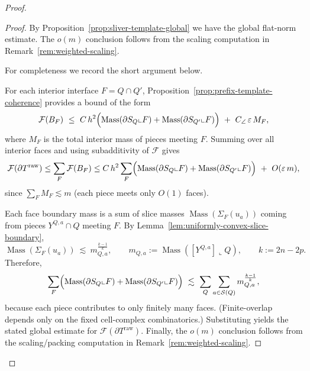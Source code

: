 \documentclass[11pt]{article}
\numberwithin{equation}{section}  %
\theoremstyle{plain}
\theoremstyle{definition}
\theoremstyle{remark}
\DeclareMathOperator{\Mass}{Mass}
\begin{document}
\begin{proof}
\begin{proof}
By Proposition~\ref{prop:sliver-template-global} we have the global flat-norm estimate.
The $o(m)$ conclusion follows from the scaling computation in Remark~\ref{rem:weighted-scaling}.

For completeness we record the short argument below.

For each interior interface $F=Q\cap Q'$, Proposition~\ref{prop:prefix-template-coherence} provides a bound of the form
\[
\mathcal F(B_F)
\ \le\ C\,h^2\Bigl(\Mass(\partial S_Q\llcorner F)+\Mass(\partial S_{Q'}\llcorner F)\Bigr)\ +\ C_{\angle}\,\varepsilon\,M_F,
\]
where $M_F$ is the total interior mass of pieces meeting $F$.
Summing over all interior faces and using subadditivity of $\mathcal F$ gives
\[
\mathcal F(\partial T^{\mathrm{raw}})
\le \sum_F \mathcal F(B_F)
\le C\,h^2\sum_F\Bigl(\Mass(\partial S_Q\llcorner F)+\Mass(\partial S_{Q'}\llcorner F)\Bigr)\ +\ O(\varepsilon\,m),
\]
since $\sum_F M_F\lesssim m$ (each piece meets only $O(1)$ faces).

\smallskip\noindent
Each face boundary mass is a sum of slice masses $\Mass(\Sigma_F(u_a))$ coming from pieces $Y^{Q,a}\cap Q$ meeting $F$.
By Lemma~\ref{lem:uniformly-convex-slice-boundary},
\[
\Mass(\Sigma_F(u_a))\ \lesssim\ m_{Q,a}^{\frac{k-1}{k}},
\qquad m_{Q,a}:=\Mass([Y^{Q,a}]\llcorner Q),\qquad k:=2n-2p.
\]
Therefore,
\[
\sum_F\Bigl(\Mass(\partial S_Q\llcorner F)+\Mass(\partial S_{Q'}\llcorner F)\Bigr)
\ \lesssim\ \sum_Q\sum_{a\in\mathcal S(Q)} m_{Q,a}^{\frac{k-1}{k}},
\]
because each piece contributes to only finitely many faces. (Finite-overlap depends only on the fixed cell-complex combinatorics.)
Substituting yields the stated global estimate for $\mathcal F(\partial T^{\mathrm{raw}})$.
Finally, the $o(m)$ conclusion follows from the scaling/packing computation in Remark~\ref{rem:weighted-scaling}.
\end{proof}




\end{proof}
\end{document}
